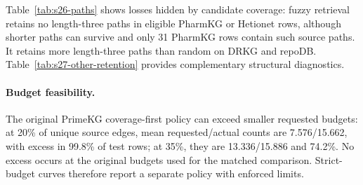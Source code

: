 \begin{revisionblock}
\par{}\noindent\begin{minipage}{\linewidth}

\centering\small
{}
\label{tab:s26-paths}


\end{minipage}\par\medskip

Table~\ref{tab:s26-paths} shows losses hidden by candidate coverage: fuzzy retrieval retains no length-three paths in eligible PharmKG or Hetionet rows, although shorter paths can survive and only 31 PharmKG rows contain such source paths. It retains more length-three paths than random on DRKG and repoDB. Table~\ref{tab:s27-other-retention} provides complementary structural diagnostics.

\par{}\noindent\begin{minipage}{\linewidth}

\centering\small\setlength{\tabcolsep}{4pt}
\label{tab:s27-other-retention}


\end{minipage}\par\medskip

\paragraph{Budget feasibility.}
The original PrimeKG coverage-first policy can exceed smaller requested budgets: at 20\% of unique source edges, mean requested/actual counts are 7.576/15.662, with excess in 99.8\% of test rows; at 35\%, they are 13.336/15.886 and 74.2\%. No excess occurs at the original budgets used for the matched comparison. Strict-budget curves therefore report a separate policy with enforced limits.


\end{revisionblock}
